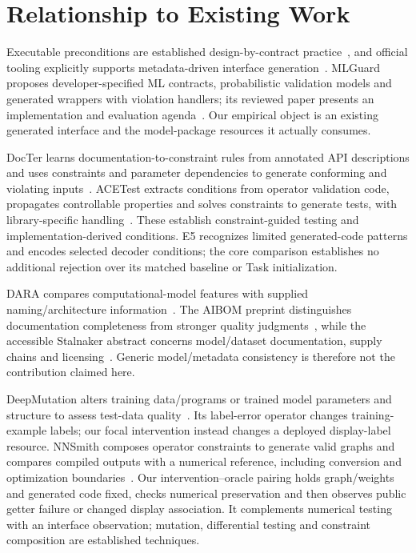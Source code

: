 \documentclass[10pt,twocolumn,letterpaper]{article}
\begin{document}
\section{Relationship to Existing Work}
\label{sec:related}
Executable preconditions are established design-by-contract practice~\cite{meyer}, and official tooling explicitly supports metadata-driven interface generation~\cite{codegen-doc}. MLGuard proposes developer-specified ML contracts, probabilistic validation models and generated wrappers with violation handlers; its reviewed paper presents an implementation and evaluation agenda~\cite{mlguard}. Our empirical object is an existing generated interface and the model-package resources it actually consumes.

DocTer learns documentation-to-constraint rules from annotated API descriptions and uses constraints and parameter dependencies to generate conforming and violating inputs~\cite{docter}. ACETest extracts conditions from operator validation code, propagates controllable properties and solves constraints to generate tests, with library-specific handling~\cite{acetest}. These establish constraint-guided testing and implementation-derived conditions. E5 recognizes limited generated-code patterns and encodes selected decoder conditions; the core comparison establishes no additional rejection over its matched baseline or Task initialization.

DARA compares computational-model features with supplied naming/architecture information~\cite{dara}. The AIBOM preprint distinguishes documentation completeness from stronger quality judgments~\cite{aibom}, while the accessible Stalnaker abstract concerns model/dataset documentation, supply chains and licensing~\cite{stalnaker}. Generic model/metadata consistency is therefore not the contribution claimed here.

DeepMutation alters training data/programs or trained model parameters and structure to assess test-data quality~\cite{deepmutation}. Its label-error operator changes training-example labels; our focal intervention instead changes a deployed display-label resource. NNSmith composes operator constraints to generate valid graphs and compares compiled outputs with a numerical reference, including conversion and optimization boundaries~\cite{nnsmith}. Our intervention--oracle pairing holds graph/weights and generated code fixed, checks numerical preservation and then observes public getter failure or changed display association. It complements numerical testing with an interface observation; mutation, differential testing and constraint composition are established techniques.
\end{document}
